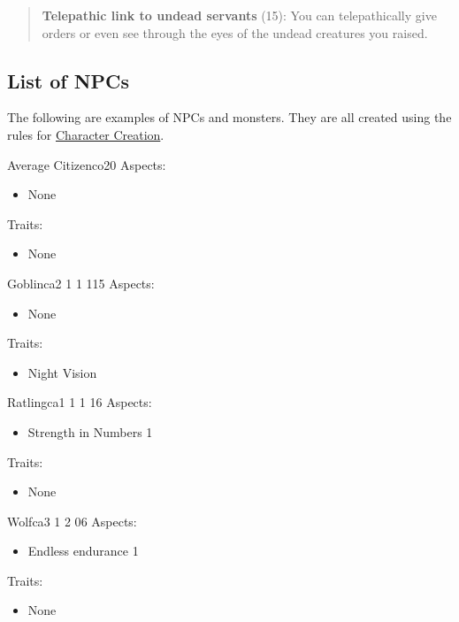 \documentclass[11pt]{article}
\begin{document}
{\begin{quote}
\textbf{Telepathic link to undead servants} (15): You can telepathically give orders or even see through the eyes of the undead creatures you raised. 
\end{quote}

\subsection{List of NPCs}
\label{sec:org80b35b5}
The following are examples of NPCs and monsters. They are all created using the rules for \hyperref[sec:org472b2c9]{Character Creation}. 

\begin{npc}{Average Citizen}{co}{2}{0}
Aspects:
\begin{itemize}
\item None
\end{itemize}
Traits:
\begin{itemize}
\item None
\end{itemize}
\end{npc}

\begin{npc}{Goblin}{ca}{2 1 1 1}{15}
Aspects:
\begin{itemize}
\item None
\end{itemize}
Traits:
\begin{itemize}
\item Night Vision
\end{itemize}
\end{npc}

\begin{npc}{Ratling}{ca}{1 1 1 1}{6}
Aspects:
\begin{itemize}
\item Strength in Numbers 1
\end{itemize}
Traits:
\begin{itemize}
\item None
\end{itemize}
\end{npc}

\begin{npc}{Wolf}{ca}{3 1 2 0}{6}
Aspects:
\begin{itemize}
\item Endless endurance 1
\end{itemize}
Traits:
\begin{itemize}
\item None
\end{itemize}
\end{npc}

}
\end{document}
